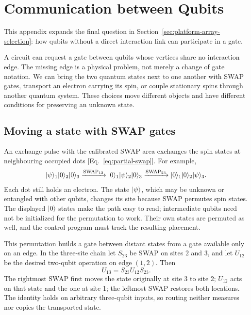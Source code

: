 \FloatBarrier
\section{Communication between Qubits}
\label{app:qubit-communication}

\label{sec:interqubit-communication}

This appendix expands the final question in
Section~\ref{sec:platform-array-selection}: how qubits without a direct
interaction link can participate in a gate.

A circuit can request a gate between qubits whose vertices share
no interaction edge. The missing edge is a physical problem, not
merely a change of gate notation. We can bring the two quantum
states next to one another with SWAP gates, transport an electron
carrying its spin, or couple stationary spins through another
quantum system. These choices move different objects and have
different conditions for preserving an unknown state.

\subsection{Moving a state with SWAP gates}
\label{sec:processor-swap-routing}

An exchange pulse with the calibrated SWAP area exchanges the
spin states at neighbouring occupied dots
[Eq.~\eqref{eq:partial-swap}]. For example,
\begin{equation}
 \ket{\psi}_1\ket0_2\ket0_3
 \xrightarrow{\mathrm{SWAP}_{12}}
 \ket0_1\ket{\psi}_2\ket0_3
 \xrightarrow{\mathrm{SWAP}_{23}}
 \ket0_1\ket0_2\ket{\psi}_3.
 \label{eq:processor-swap-transfer}
\end{equation}
Each dot still holds an electron. The state \(\lvert \psi\rangle\),
which may be unknown or entangled with other qubits, changes
its site because SWAP permutes spin states. The displayed
\(\lvert 0\rangle\) states make the path easy to read; intermediate
qubits need not be initialized for the permutation to work.
Their own states are permuted as well, and the control program
must track the resulting placement.

This permutation builds a gate between distant states from a
gate available only on an edge. In the three-site chain let
\(S_{23}\) be SWAP on sites 2 and 3, and let \(U_{12}\) be the
desired two-qubit operation on edge \((1,2)\). Then
\begin{equation}
 U_{13}=S_{23}U_{12}S_{23}.
 \label{eq:processor-routed-gate}
\end{equation}
The rightmost SWAP first moves the state originally at site 3
to site 2; \(U_{12}\) acts on that state and the one at site 1;
the leftmost SWAP restores both locations. The identity holds
on arbitrary three-qubit inputs, so routing neither measures
nor copies the transported state.

